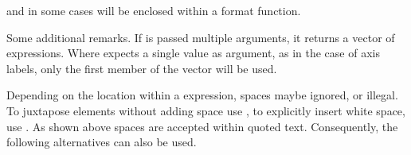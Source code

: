 \documentclass[krantz2]{krantz}\usepackage{knitr}%
\begin{document}
\begin{explainbox}
and in some cases will be enclosed within a format function.

\begin{knitrout}\footnotesize
{}\color{fgcolor}\begin{kframe}
\begin{alltt}
  \hlopt{+}
  \hlstd{()} \hlopt{+}
  \hlstd{(}\hlstd{(} \hlstd{=} \hlstd{))}
\end{alltt}
\end{kframe}
\end{knitrout}

Some additional remarks. If  is passed multiple arguments, it returns a vector of expressions. Where  expects a single value as argument, as in the case of axis labels, only the first member of the vector will be used.

\begin{knitrout}\footnotesize
{}\color{fgcolor}\begin{kframe}
\begin{alltt}
  \hlopt{+}
  \hlstd{()} \hlopt{+}
  \hlstd{(}\hlstd{(x[}\hlstd{],} \hlstd{))}
\end{alltt}
\end{kframe}
\end{knitrout}

Depending on the location within a expression, spaces maybe ignored, or illegal. To juxtapose elements without adding space use \code{*}, to explicitly insert white space, use \code{\textasciitilde}. As shown above spaces are accepted within quoted text. Consequently, the following alternatives can also be used.

\begin{knitrout}\footnotesize
{}\color{fgcolor}\begin{kframe}
\begin{alltt}
  \hlstd{(}\hlstd{(} \hlstd{=} \hlstd{))}
\end{alltt}
\end{kframe}
\end{knitrout}


\end{explainbox}
\end{document}
